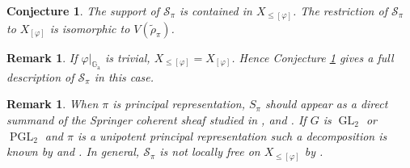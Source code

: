 \documentclass[12pt,a4paper]{article}
\newtheorem{conj}[thm]{Conjecture}
\newtheorem{rem}[thm]{Remark}
\DeclareMathOperator{\GL}{GL}
\DeclareMathOperator{\PGL}{PGL}
\newcommand{\cf}{\textit{cf.\ }}
\newcommand{\mc}{\mathcal}
\newcommand{\Ga}{\mathbb{G}_{\mathrm{a}}}
\begin{document}
\begin{conj}\label{conj:catfin}
The support of $\mc{S}_{\pi}$ is contained in $X_{\leq [\varphi]}$. 
The restriction of $\mc{S}_{\pi}$ to $X_{[\varphi]}$ is isomorphic to 
$V(\widetilde{\rho}_{\pi})$. 
\end{conj}

\begin{rem}
If $\varphi|_{\Ga}$ is trivial, $X_{\leq [\varphi]}=X_{[\varphi]}$. %
Hence Conjecture \ref{conj:catfin} gives a full description of $\mc{S}_{\pi}$ in this case. 
\end{rem}

\begin{rem}
When $\pi$ is principal representation, $S_{\pi}$ should appear
as a direct summand of the Springer coherent sheaf studied in
\cite{BCHNCohSpr}, \cite{HelderIH} and \cite{ZhuCohLp}.
If $G$ is $\GL_2$ or $\PGL_2$ and $\pi$ is a unipotent principal representation such a decomposition is known by
\cite[Proposition 4.27]{HelderIH} and \cite[Example 4.4.4]{ZhuCohLp}.
In general, $\mc{S}_{\pi}$ is not locally free on $X_{\leq [\varphi]}$ by \cite[Remark 4.28]{HelderIH}.
\end{rem}

%
%
\end{document}
